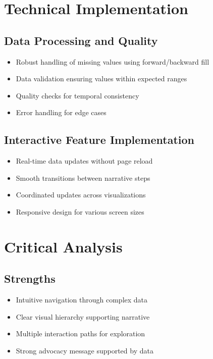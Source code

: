 \documentclass{article}
\begin{document}
\section{Technical Implementation}
\subsection{Data Processing and Quality}
\begin{itemize}
    \item Robust handling of missing values using forward/backward fill
    \item Data validation ensuring values within expected ranges
    \item Quality checks for temporal consistency
    \item Error handling for edge cases
\end{itemize}

\subsection{Interactive Feature Implementation}
\begin{itemize}
    \item Real-time data updates without page reload
    \item Smooth transitions between narrative steps
    \item Coordinated updates across visualizations
    \item Responsive design for various screen sizes
\end{itemize}

\section{Critical Analysis}
\subsection{Strengths}
\begin{itemize}
    \item Intuitive navigation through complex data
    \item Clear visual hierarchy supporting narrative
    \item Multiple interaction paths for exploration
    \item Strong advocacy message supported by data
\end{itemize}
\end{document}
